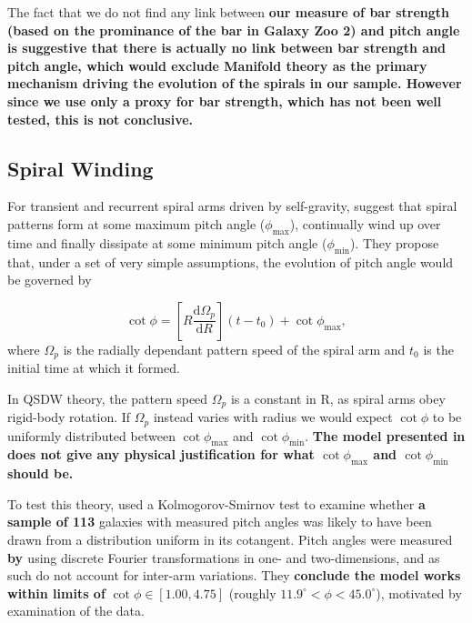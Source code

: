 The fact that we do not find any link between \textbf{our measure of bar strength (based on the prominance of the bar in Galaxy Zoo 2) and pitch angle is suggestive that there is actually no link between bar strength and pitch angle, which would exclude Manifold theory as the primary mechanism driving the evolution of the spirals in our sample. However since we use only a proxy for bar strength, which has not been well tested, this is not conclusive.}

\subsection{Spiral Winding}
\label{section:spiral_winding}

For transient and recurrent spiral arms driven by self-gravity, \citet{2019arXiv190910291P} suggest that spiral patterns form at some maximum pitch angle ($\phi_\mathrm{max}$), continually wind up over time and finally dissipate at some minimum pitch angle ($\phi_\mathrm{min}$). They propose that, under a set of very simple assumptions, the evolution of pitch angle would be governed by

\begin{equation}
  \label{eq:winding}
  \cot{\phi} = \left[R\frac{\mathrm{d}\Omega_p}{\mathrm{d}R}\right](t - t_0) + \cot{\phi_\mathrm{max}},
\end{equation}
where $\Omega_p$ is the radially dependant pattern speed of the spiral arm and $t_0$ is the initial time at which it formed.

In QSDW theory, the pattern speed $\Omega_p$ is a constant in R, as spiral arms obey rigid-body rotation. If $\Omega_p$ instead varies with radius we would expect $\cot{\phi}$ to be uniformly distributed between $\cot{\phi_\mathrm{max}}$ and $\cot{\phi_\mathrm{min}}$. {\bf The model presented in \citet{2019arXiv190910291P} does not give any physical justification for what $\cot{\phi_\mathrm{max}}$ and $\cot{\phi_\mathrm{min}}$ should be. }

To test this theory, \citet{2019arXiv190910291P} used a Kolmogorov-Smirnov test to examine whether {\bf a sample of 113} galaxies with measured pitch angles was likely to have been drawn from a distribution uniform in its cotangent. Pitch angles were measured {\bf by \citet{2019ApJ...871..194Y}} using discrete Fourier transformations in one- and two-dimensions, and as such do not account for inter-arm variations. They {\bf conclude the model works within limits of} $\cot{\phi} \in [1.00, 4.75]$ (roughly $11.9^\circ < \phi < 45.0^\circ$), motivated by examination of the data.

